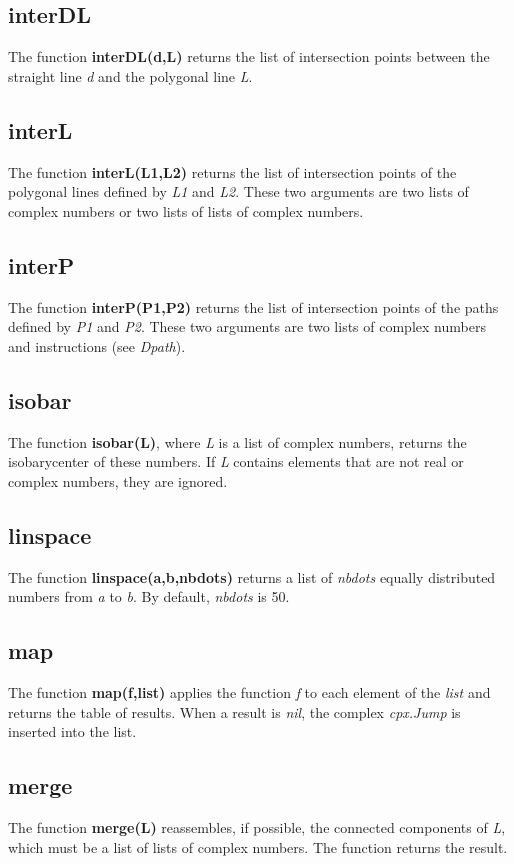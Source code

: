 \subsection{interDL}
The function \textbf{interDL(d,L)} returns the list of intersection points between the straight line \emph{d} and the polygonal line \emph{L}.

\subsection{interL}
The function \textbf{interL(L1,L2)} returns the list of intersection points of the polygonal lines defined by \emph{L1} and \emph{L2}. These two arguments are two lists of complex numbers or two lists of lists of complex numbers.

\subsection{interP}
The function \textbf{interP(P1,P2)} returns the list of intersection points of the paths defined by \emph{P1} and \emph{P2}. These two arguments are two lists of complex numbers and instructions (see \emph{Dpath}).

\subsection{isobar}
The function \textbf{isobar(L)}, where \emph{L} is a list of complex numbers, returns the isobarycenter of these numbers. If \emph{L} contains elements that are not real or complex numbers, they are ignored.

\subsection{linspace}
The function \textbf{linspace(a,b,nbdots)} returns a list of \emph{nbdots} equally distributed numbers from \emph{a} to \emph{b}. By default, \emph{nbdots} is 50.

\subsection{map}
The function \textbf{map(f,list)} applies the function \emph{f} to each element of the \emph{list} and returns the table of results. When a result is \emph{nil}, the complex \emph{cpx.Jump} is inserted into the list.

\subsection{merge}
The function \textbf{merge(L)} reassembles, if possible, the connected components of \emph{L}, which must be a list of lists of complex numbers. The function returns the result.

